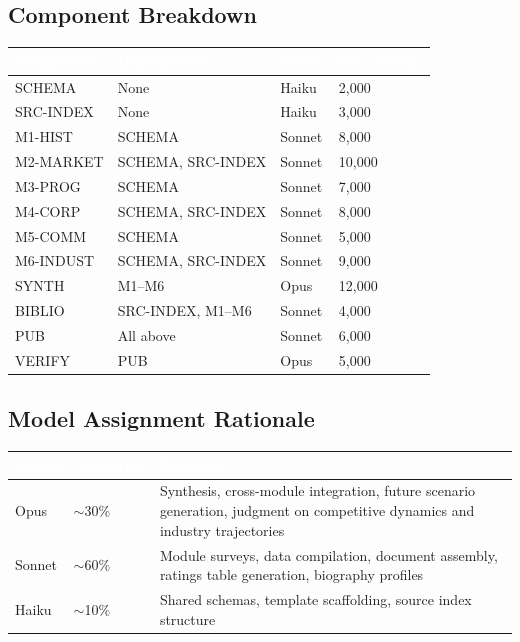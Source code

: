 \documentclass[11pt,letterpaper]{article}
\newcommand{\tableheader}[1]{\textbf{\sffamily\textcolor{white}{#1}}}
\begin{document}
\subsection{Component Breakdown}

\begin{center}
\begin{tabularx}{\textwidth}{L{2.5cm}L{2cm}C{1.5cm}C{2cm}}
\toprule
{}
\tableheader{Component} & \tableheader{Dependencies} & \tableheader{Model} & \tableheader{Est.\ Tokens} \\
\midrule
SCHEMA & None & Haiku & 2,000 \\
SRC-INDEX & None & Haiku & 3,000 \\
M1-HIST & SCHEMA & Sonnet & 8,000 \\
M2-MARKET & SCHEMA, SRC-INDEX & Sonnet & 10,000 \\
M3-PROG & SCHEMA & Sonnet & 7,000 \\
M4-CORP & SCHEMA, SRC-INDEX & Sonnet & 8,000 \\
M5-COMM & SCHEMA & Sonnet & 5,000 \\
M6-INDUST & SCHEMA, SRC-INDEX & Sonnet & 9,000 \\
SYNTH & M1--M6 & Opus & 12,000 \\
BIBLIO & SRC-INDEX, M1--M6 & Sonnet & 4,000 \\
PUB & All above & Sonnet & 6,000 \\
VERIFY & PUB & Opus & 5,000 \\
\bottomrule
\end{tabularx}
\end{center}

\subsection{Model Assignment Rationale}

\begin{center}
\begin{tabularx}{\textwidth}{L{2cm}C{1.5cm}X}
\toprule
{}
\tableheader{Model} & \tableheader{Allocation} & \tableheader{Rationale} \\
\midrule
Opus & $\sim$30\% & Synthesis, cross-module integration, future scenario generation, judgment on competitive dynamics and industry trajectories \\
Sonnet & $\sim$60\% & Module surveys, data compilation, document assembly, ratings table generation, biography profiles \\
Haiku & $\sim$10\% & Shared schemas, template scaffolding, source index structure \\
\bottomrule
\end{tabularx}
\end{center}
\end{document}
